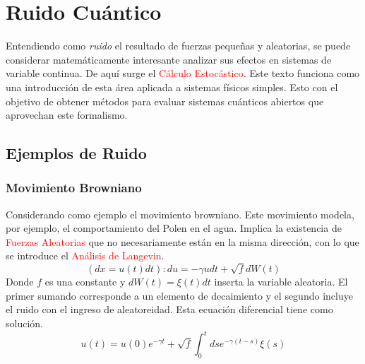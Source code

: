 \documentclass{book}
\begin{document}
\chapter{Ruido Cuántico}
Entendiendo como \textit{ruido} el resultado de fuerzas pequeñas y aleatorias, se puede considerar matemáticamente interesante analizar sus efectos en sistemas de variable continua. De aquí surge el \textcolor{red}{Cálculo Estocástico}.
Este texto funciona como una introducción de esta área aplicada a sistemas físicos simples. Esto con el objetivo de obtener métodos para evaluar sistemas cuánticos abiertos que aprovechan este formalismo.
\section{Ejemplos de Ruido}
\subsection{Movimiento Browniano}
Considerando como ejemplo el movimiento browniano. Este movimiento modela, por ejemplo, el comportamiento del Polen en el agua. Implica la existencia de \textcolor{red}{Fuerzas Aleatorias} que no necesariamente están en la misma dirección, con lo que se introduce el \textcolor{red}{Análisis de Langevin}.
\begin{equation}\label{eq7.1}(dx=u(t)dt): du=-\gamma u dt +\sqrt{f}dW(t)\end{equation} Donde $f$ es una constante y $dW(t)=\xi(t) dt$ inserta la variable aleatoria. El primer sumando corresponde a un elemento de decaimiento y el segundo incluye el ruido con el ingreso de aleatoreidad.
Esta ecuación diferencial tiene como solución.
\begin{equation}\label{eq7.2} u(t)=u(0)e^{-\gamma t}+\sqrt{f}\int_0^t ds e^{-\gamma(t-s)}\xi(s)\end{equation}
\end{document}
